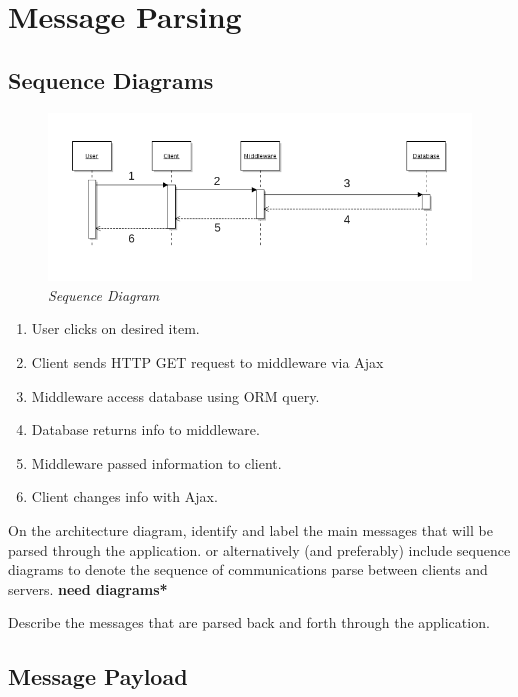 \documentclass{sig-alt-release2}
\begin{document}
\section{Message Parsing}

\subsection{Sequence Diagrams}

\begin{figure}[!htbp]
  \caption{\textit{Sequence Diagram}}
  \begin{center}
		\includegraphics[scale=0.35]{img/sequencelabel.png}
  \end{center}
\end{figure}

\begin{enumerate}
\item User clicks on desired item.
\item Client sends HTTP GET request to middleware via Ajax
\item Middleware access database using ORM query.
\item Database returns info to middleware.
\item Middleware passed information to client.
\item Client changes info with Ajax.
\end{enumerate}

On the architecture diagram, identify and label the main messages that will be parsed through the application.
or alternatively (and preferably) include sequence diagrams to denote the sequence of communications parse between clients and servers. {\bf *need diagrams*} 

Describe the messages that are parsed back and forth through the application.

\subsection{Message Payload}
\end{document}
